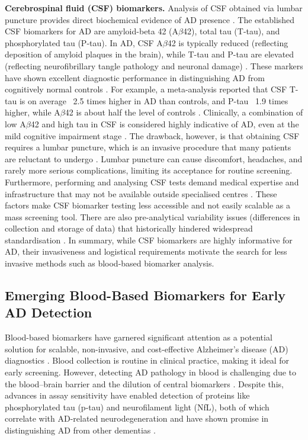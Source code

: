 \documentclass[a4paper,12pt]{article}
\begin{document}
\textbf{Cerebrospinal fluid (CSF) biomarkers.} Analysis of CSF obtained via lumbar puncture provides direct biochemical evidence of AD presence \cite{blennow2009csf}. The established CSF biomarkers for AD are amyloid-beta 42 (A$\beta$42), total tau (T-tau), and phosphorylated tau (P-tau). In AD, CSF A$\beta$42 is typically reduced (reflecting deposition of amyloid plaques in the brain), while T-tau and P-tau are elevated (reflecting neurofibrillary tangle pathology and neuronal damage) \cite{blennow2009csf, olsson2016csf}. These markers have shown excellent diagnostic performance in distinguishing AD from cognitively normal controls \cite{olsson2016csf}. For example, a meta-analysis reported that CSF T-tau is on average ~2.5 times higher in AD than controls, and P-tau ~1.9 times higher, while A$\beta$42 is about half the level of controls \cite{olsson2016csf}. Clinically, a combination of low A$\beta$42 and high tau in CSF is considered highly indicative of AD, even at the mild cognitive impairment stage \cite{olsson2016csf}. The drawback, however, is that obtaining CSF requires a lumbar puncture, which is an invasive procedure that many patients are reluctant to undergo \cite{blennow2009csf}. Lumbar puncture can cause discomfort, headaches, and rarely more serious complications, limiting its acceptance for routine screening. Furthermore, performing and analysing CSF tests demand medical expertise and infrastructure that may not be available outside specialised centres \cite{blennow2009csf}. These factors make CSF biomarker testing less accessible and not easily scalable as a mass screening tool. There are also pre-analytical variability issues (differences in collection and storage of data) that historically hindered widespread standardisation \cite{jammeh2016identification}. In summary, while CSF biomarkers are highly informative for AD, their invasiveness and logistical requirements motivate the search for less invasive methods such as blood-based biomarker analysis.


\subsection{Emerging Blood-Based Biomarkers for Early AD Detection}
Blood-based biomarkers have garnered significant attention as a potential solution for scalable, non-invasive, and cost-effective Alzheimer's disease (AD) diagnostics \cite{jammeh2016identification, palmqvist2020discriminative}. Blood collection is routine in clinical practice, making it ideal for early screening. However, detecting AD pathology in blood is challenging due to the blood–brain barrier and the dilution of central biomarkers \cite{hampel2018blood}. Despite this, advances in assay sensitivity have enabled detection of proteins like phosphorylated tau (p-tau) and neurofilament light (NfL), both of which correlate with AD-related neurodegeneration and have shown promise in distinguishing AD from other dementias \cite{olsson2016csf, palmqvist2020discriminative}.
\end{document}
